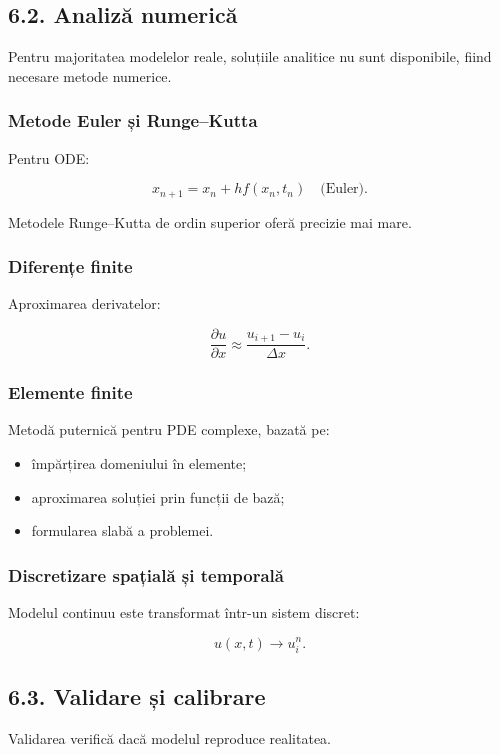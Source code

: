 \documentclass[12pt,a4paper]{article}
\begin{document}
\subsection{6.2. Analiză numerică}

Pentru majoritatea modelelor reale, soluțiile analitice nu sunt disponibile, fiind necesare metode numerice.

\subsubsection*{Metode Euler și Runge--Kutta}
Pentru ODE:


\[
x_{n+1} = x_n + h f(x_n, t_n) \quad \text{(Euler)}.
\]


Metodele Runge--Kutta de ordin superior oferă precizie mai mare.

\subsubsection*{Diferențe finite}
Aproximarea derivatelor:


\[
\frac{\partial u}{\partial x} \approx \frac{u_{i+1} - u_i}{\Delta x}.
\]



\subsubsection*{Elemente finite}
Metodă puternică pentru PDE complexe, bazată pe:
\begin{itemize}
    \item împărțirea domeniului în elemente;
    \item aproximarea soluției prin funcții de bază;
    \item formularea slabă a problemei.
\end{itemize}

\subsubsection*{Discretizare spațială și temporală}
Modelul continuu este transformat într-un sistem discret:


\[
u(x,t) \rightarrow u_{i}^{n}.
\]



\subsection{6.3. Validare și calibrare}

Validarea verifică dacă modelul reproduce realitatea.
\end{document}
